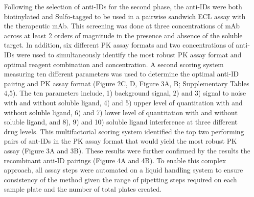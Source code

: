 Following the selection of anti-IDs for the second phase, the anti-IDs were both biotinylated and Sulfo-tagged to be used in a pairwise sandwich ECL assay with the therapeutic mAb.  This screening was done at three concentrations of mAb across at least 2 orders of magnitude in the presence and absence of the soluble target.  In addition, six different PK assay formats and two concentrations of anti-IDs were used to simultaneously identify the most robust PK assay format and optimal reagent combination and concentration.  A second scoring system measuring ten different parameters was used to determine the optimal anti-ID pairing and PK assay format (Figure 2C, D, Figure 3A, B; Supplementary Tables 4,5).  The ten parameters include, 1) background signal, 2) and 3) signal to noise with and without soluble ligand, 4) and 5) upper level of quantitation with and without soluble ligand, 6) and 7) lower level of quantitation with and without soluble ligand, and 8), 9) and 10) soluble ligand interference at three different drug levels. This multifactorial scoring system identified the top two performing pairs of ant-IDs in the PK assay format that would yield the most robust PK assay (Figure 3A and 3B).  These results were further confirmed by the results the recombinant anti-ID pairings (Figure 4A and 4B).  To enable this complex approach, all assay steps were automated on a liquid handling system to ensure consistency of the method given the range of pipetting steps required on each sample plate and the number of total plates created.

